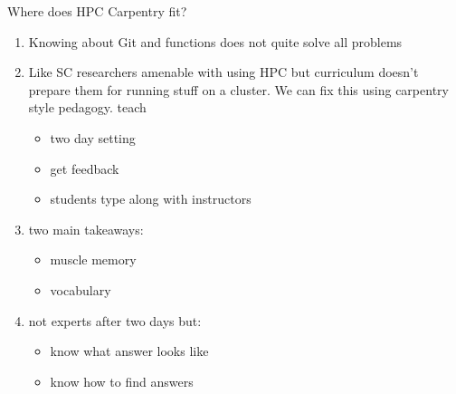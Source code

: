 \begin{frame}{Where does HPC Carpentry fit?}
	\begin{enumerate}
		\item Knowing about Git and functions does not quite solve all problems
		\item Like SC researchers amenable with using HPC but curriculum doesn't prepare them for running stuff on a cluster. We can fix this using carpentry style pedagogy.
		teach
		\begin{itemize}
			\item two day setting
			\item get feedback
			\item students type along with instructors
		\end{itemize}
		\item two main takeaways:
			\begin{itemize}
				\item muscle memory 
				\item vocabulary
			\end{itemize}
		\item not experts after two days but:
			\begin{itemize}
				\item know what answer looks like
				\item know how to find answers
			\end{itemize} 
	\end{enumerate}
	
\end{frame}